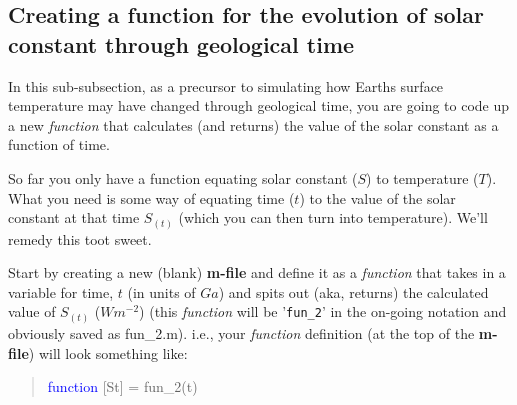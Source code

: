 \documentclass{tufte-book} %
\newenvironment{docspec}{\begin{quotation}\ttfamily\parskip0pt\parindent0pt\ignorespaces}{\end{quotation}}
\begin{document}
\subsection{Creating a function for the evolution of solar constant through geological time}

In this  sub-subsection, as a precursor to simulating how Earths surface temperature may have changed through geological time, you are going to code up a new \textit{function} that calculates (and returns) the value of the solar constant as a function of time.

So far you only have a function equating solar constant (\(S\)) to temperature (\(T\)). What you need is some way of equating time (\(t\)) to the value of the solar constant at that time \(S_{(t)}\) (which you can then turn into temperature). We'll remedy this toot sweet.

Start by creating a new  (blank) \textbf{m-file} and define it as a \textit{function} that takes in a variable for time, \(t\) (in units of \(Ga\)) and spits out  (aka, returns) the calculated value of \(S_{(t)}\) (\(Wm^{-2}\)) (this \textit{function} will be '\texttt{fun\_2}' in the on-going notation and obviously saved as \textsf{fun\_2.m}). i.e., your \textit{function} definition (at the top of the \textbf{m-file}) will look something like:
\begin{docspec}
\textcolor{blue}{function} [St] = fun\_2(t)
\end{docspec}
\end{document}
